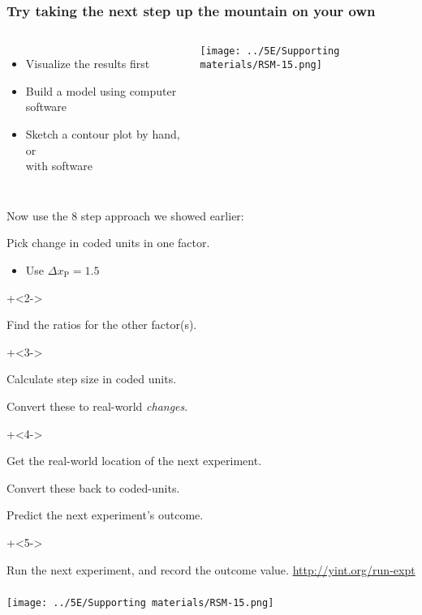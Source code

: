 \begin{frame}\frametitle{Try taking the next step up the mountain on your own}
	
	\begin{columns}[T]
		
			\begin{itemize}
				\item	Visualize the results first
				\item	Build a model using computer software
				\item	Sketch a contour plot by hand, or \\with software
			\end{itemize}
			\centerline{\texttt{[image: ../5E/Supporting materials/RSM-15.png]}}
	\end{columns}
	
	\pause
	\vspace{-2.5cm}
	{\color{myOrange}Now use the 8 step approach we showed earlier:}
	\vspace{0.2cm}
	\begin{enumerate}

			\item	Pick change in coded units in one factor. 
				\begin{itemize}
					\item	Use $\Delta x_\text{P}= 1.5$
				\end{itemize}
			\onslide+<2->{
				\item	Find the ratios for the other factor(s).
			}
			\onslide+<3->{
				\item	Calculate step size in coded units.
				\item	Convert these to real-world \emph{changes}.
			}
			\onslide+<4->{
				\item	Get the real-world location	of the next experiment.
				\item	Convert these back to coded-units.
				\item	Predict the next experiment's outcome.
			}
			\onslide+<5->{
				\item	Run the next experiment, and record the outcome value.  \href{http://yint.org/run-expt}{http://yint.org/run-expt}
			}
	\end{enumerate}
	
\end{frame}

\begin{frame}\frametitle{}
	\centerline{\texttt{[image: ../5E/Supporting materials/RSM-15.png]}}
\end{frame}


